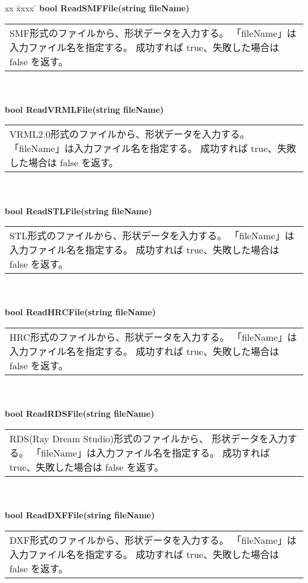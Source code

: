 \begin{tabbing}
xx \= xxxx \= \kill
\> \textbf{bool ReadSMFFile(string fileName)} \\
	\> \> \begin{tabular}{p{15cm}}
		SMF形式のファイルから、形状データを入力する。
		「fileName」は入力ファイル名を指定する。
		成功すれば true、失敗した場合は false を返す。
	\end{tabular} \\ \\

\> \textbf{bool ReadVRMLFile(string fileName)} \\
	\> \> \begin{tabular}{p{15cm}}
		VRML2.0形式のファイルから、形状データを入力する。
		「fileName」は入力ファイル名を指定する。
		成功すれば true、失敗した場合は false を返す。
	\end{tabular} \\ \\

\> \textbf{bool ReadSTLFile(string fileName)} \\
	\> \> \begin{tabular}{p{15cm}}
		STL形式のファイルから、形状データを入力する。
		「fileName」は入力ファイル名を指定する。
		成功すれば true、失敗した場合は false を返す。
	\end{tabular} \\ \\

\> \textbf{bool ReadHRCFile(string fileName)} \\
	\> \> \begin{tabular}{p{15cm}}
		HRC形式のファイルから、形状データを入力する。
		「fileName」は入力ファイル名を指定する。
		成功すれば true、失敗した場合は false を返す。
	\end{tabular} \\ \\

\> \textbf{bool ReadRDSFile(string fileName)} \\
	\> \> \begin{tabular}{p{15cm}}
		RDS(Ray Dream Studio)形式のファイルから、
		形状データを入力する。
		「fileName」は入力ファイル名を指定する。
		成功すれば true、失敗した場合は false を返す。
	\end{tabular} \\ \\

\> \textbf{bool ReadDXFFile(string fileName)} \\
	\> \> \begin{tabular}{p{15cm}}
		DXF形式のファイルから、形状データを入力する。
		「fileName」は入力ファイル名を指定する。
		成功すれば true、失敗した場合は false を返す。
	\end{tabular} \\ \\


\end{tabbing}

